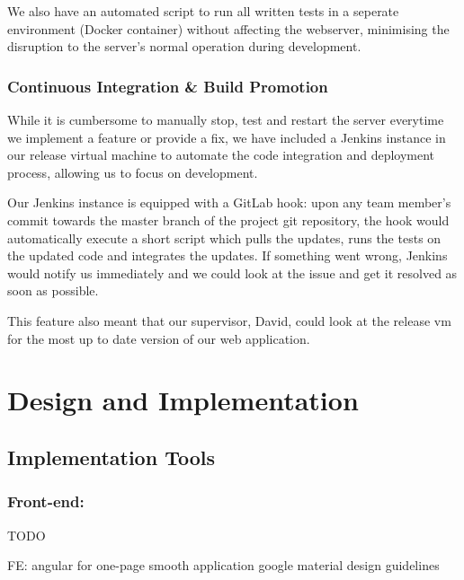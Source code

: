 \documentclass[a4paper, titlepage]{article}
\begin{document}
We also have an automated script to run all written tests in a seperate
environment (Docker container) without affecting the webserver, minimising
the disruption to the server's normal operation during development.



\subsubsection{Continuous Integration \& Build Promotion}

While it is cumbersome to manually stop, test and restart the server
everytime we implement a feature or provide a fix, we have
included a Jenkins instance in our release virtual machine to automate
the code integration and deployment process, allowing us to focus on
development.

Our Jenkins instance is equipped with a GitLab hook: upon any team member's
commit towards the master branch of the project git repository, the hook would
automatically execute a short script which pulls the updates, runs the tests
on the updated code and integrates the updates. If something went wrong,
Jenkins would notify us immediately and we could look at the issue and get
it resolved as soon as possible.

This feature also meant that our supervisor, David, could look at the release vm 
for the most up to date version of our web application. 


\newpage
\section{Design and Implementation}

\subsection{Implementation Tools}

\subsubsection{Front-end: }
TODO 

FE: 
  angular for one-page smooth application
  google material design guidelines
\end{document}

